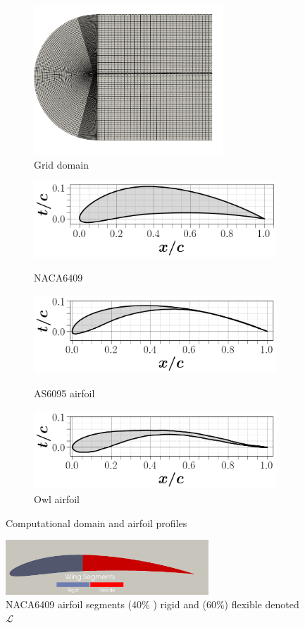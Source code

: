 \begin{figure}[hbt!]
\centering
\begin{subfigure}{.4\textwidth}
\includegraphics[width=2.8in]{Figures/mesh fluid.png}
\caption{\label{fig:Griddomain} Grid domain}
\label{fig:airfoildesigna}
\end{subfigure}
\begin{subfigure}{.4\textwidth}
\includegraphics[width=.6\columnwidth]{Figures/naca_airfoil.png}
\caption{\label{fig:6409}NACA6409}
\includegraphics[width=.6\columnwidth]{Figures/AS9065_airfoil.png}
\caption{\label{fig:AS6095}AS6095 airfoil \cite{Ananda2018}}
\includegraphics[width=.6\columnwidth]{Figures/owl_airfoil.png}
\caption{\label{fig:owl}Owl airfoil \cite{Liu2004}}
\end{subfigure}
\caption{\label{fig:Ggeometry} Computational domain and airfoil profiles}
\end{figure}

\begin{figure}[hbt!]
\centering
\includegraphics[width=3in]{Figures/airfoilgeometry.png}
\caption{\label{fig:airfoilSegments} NACA6409 airfoil segments (40\% ) rigid and (60\%) flexible denoted $\mathcal{L}$}
\end{figure}

